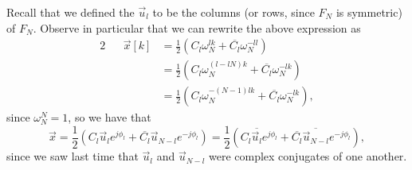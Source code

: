 \documentclass[letterpaper]{article}
\theoremstyle{remark}
\newcommand{\eqn}[1]{\begin{alignat*}{2}#1\end{alignat*}}
\begin{document}
Recall that we defined the $\vec{u}_l$ to be the columns (or rows, since $F_N$ is symmetric) of $F_N$. Observe in particular that we can rewrite the above expression as
\eqn{
    && \vec{x}[k] &= \frac{1}{2} (C_l\omega_N^{lk} + \overline{C_l}\omega_N^{-ll}) \\
    &&&= \frac{1}{2} (C_l\omega_N^{(l - lN)k} + \overline{C_l}\omega_N^{-lk}) \\
    &&&= \frac{1}{2} (C_l\omega_N^{-(N - 1)lk} + \overline{C_l}\omega_N^{-lk}),
}
since $\omega_N^N = 1$, so we have that
\[
    \vec{x} = \frac{1}{2} (C_l\vec{u}_l e^{j\phi_l} + \overline{C_l}\vec{u}_{N - l} e^{-j\phi_l}) = \frac{1}{2} (C_l\overline{\vec{u}_l} e^{j\phi_l} + \overline{C_l}\overline{\vec{u}_{N-l}} e^{-j\phi_l}),
\]
since we saw last time that $\vec{u}_l$ and $\vec{u}_{N-l}$ were complex conjugates of one another.
\end{document}
